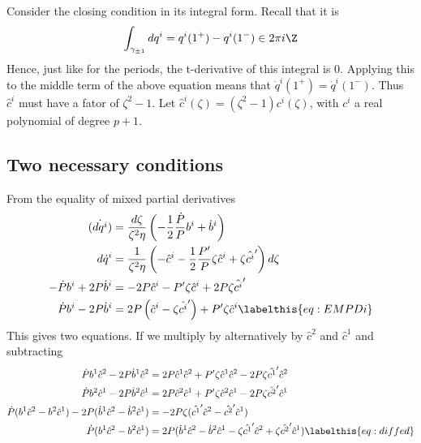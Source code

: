 Consider the closing condition in its integral form. Recall that it is
\begin{align*}
\int_{\gamma_{\pm 1}} dq^i = q^i(1^+) - q^i(1^-) \in 2\pi i \Z
\end{align*}
Hence, just like for the periods, the t-derivative of this integral is 0. Applying this to the middle term of the above equation means that $\dot q^i(1^+) = \dot q^i(1^-)$. Thus $\hat c^i$ must have a fator of $\zeta^2-1$. Let $\hat c^i(\zeta) = (\zeta^2 - 1) c^i(\zeta)$, with $c^i$ a real polynomial of degree $p+1$.




















\subsection{Two necessary conditions}
From the equality of mixed partial derivatives
\begin{align*}
\dot{(dq^i)} &= \frac{d\zeta}{\zeta^2\eta}\left( -\frac{1}{2}\frac{\dot P}{P}b^i + \dot b^i \right) \\
d\dot q^i & = \frac{1}{\zeta^2\eta}\left( -\hat c^i -\frac{1}{2}\frac{P'}{P}\zeta\hat c^i + \zeta\hat {c^i}'\right)d\zeta \\
-\dot P b^i + 2P \dot b^i & = -2P \hat c^i -P'\zeta\hat c^i + 2P\zeta\hat {c^i}' \\
\dot P b^i - 2P\dot b^i &= 2P\left( \hat c^i - \zeta\hat {c^i}'\right) + P'\zeta\hat c^i \labelthis{eq:EMPDi}
\end{align*}
This gives two equations. If we multiply by alternatively by $\hat c^2$ and $\hat c^1$ and subtracting
\begin{align*}
\dot P b^1\hat c^2 - 2P \dot b^1\hat c^2 & = 2P \hat c^1\hat c^2 +P'\zeta\hat c^1\hat c^2 - 2P\zeta\hat {c^1}'\hat c^2 \\
\dot P b^2\hat c^1 - 2P \dot b^2\hat c^1 & = 2P \hat c^2\hat c^1 +P'\zeta\hat c^2\hat c^1 - 2P\zeta\hat {c^2}'\hat c^1 \\
\dot P (b^1\hat c^2 - b^2\hat c^1) - 2P (\dot b^1\hat c^2 - \dot b^2\hat c^1) & = - 2P\zeta(\hat {c^1}'\hat c^2 - \hat {c^2}'\hat c^1) \\
\dot P (b^1\hat c^2 - b^2\hat c^1) & =  2P(\dot b^1\hat c^2 - \dot b^2\hat c^1 - \zeta\hat {c^1}'\hat c^2 + \zeta\hat {c^2}'\hat c^1)\labelthis{eq:diffed}
\end{align*}

